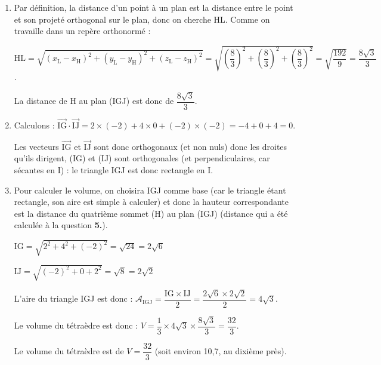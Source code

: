 \documentclass[10pt]{article}
\providecommand{\vect}[1]{\overrightarrow{#1}}
\begin{document}
\begin{enumerate}
L est donc $M_{\frac{-8}{3}}$ sur la droite $d$ : il a donc comme coordonnées L$\left(-\dfrac{-8}{3}~;~4 + \dfrac{-8}{3}~;~8 + \dfrac{-8}{3} \right)$.

Cela confirme L$\left(\dfrac{8}{3}~;~\dfrac{12-8}{3} ~;~\dfrac{24-8}{3}\right) $

Autrement dit, le point L est bien le point de coordonnées $ \left(\dfrac{8}{3}~;~\dfrac{4}{3}~;~\dfrac{16}{3}\right)  $.

\item Par définition, la distance d'un point à un plan est la distance entre le point et son projeté orthogonal sur le plan, donc on cherche HL. Comme on travaille dans un repère orthonormé :

$\mathrm{HL} = \sqrt{(x_\mathrm{L} - x_\mathrm{H})^2+(y_\mathrm{L} - y_\mathrm{H})^2+(z_\mathrm{L} - z_\mathrm{H})^2} = \sqrt{\left(\dfrac{8}{3}\right)^2+\left(\dfrac{8}{3}\right)^2+\left(\dfrac{8}{3}\right)^2 } = \sqrt{\dfrac{192}{9}}=\dfrac{8\sqrt{3}}{3}$.

La distance de H au plan (IGJ) est donc de $ \dfrac{8\sqrt{3}}{3}$.

\item Calculons : $\vect{\mathrm{IG}}\cdot\vect{\mathrm{IJ}} = 2\times (-2) + 4\times 0 +(-2)\times (-2) = -4 + 0 +4= 0$.

Les vecteurs $\vect{\mathrm{IG}}$ et $\vect{\mathrm{IJ}}$ sont donc orthogonaux (et non nuls) donc les droites qu'ils dirigent, (IG) et (IJ) sont orthogonales (et perpendiculaires, car sécantes en I) : le triangle IGJ est donc rectangle en I.

\item Pour calculer le volume, on choisira IGJ comme base (car le triangle étant rectangle, son aire est simple à calculer) et donc la hauteur correspondante est la distance du quatrième sommet (H) au plan (IGJ) (distance qui a été calculée à la question \textbf{5.}).

$\mathrm{IG} = \sqrt{2^2 + 4^2 + (-2)^2} = \sqrt{24}=2\sqrt{6}$

$ \mathrm{IJ} = \sqrt{(-2)^2 + 0 + 2^2} = \sqrt{8} = 2\sqrt{2}$

L'aire du triangle IGJ est donc : $\mathcal{A}_{\mathrm{IGJ}} = \dfrac{\mathrm{IG}\times \mathrm{IJ}}{2} = \dfrac{2\sqrt{6}\times 2\sqrt{2}}{2} = 4\sqrt{3}$.

Le volume du tétraèdre est donc : $V = \dfrac{1}{3} \times 4\sqrt{3} \times \dfrac{8\sqrt{3}}{3} = \dfrac{32}{3}$.

Le volume du tétraèdre est de $V = \dfrac{32}{3}$ (soit environ 10,7, au dixième près).
\end{enumerate}

\bigskip
\end{document}
